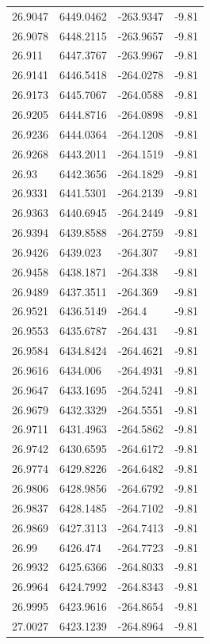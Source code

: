 \begin{table}[H]
\begin{tabular}{llll}
26.9047 & 6449.0462 & -263.9347 & -9.81 \\
26.9078 & 6448.2115 & -263.9657 & -9.81 \\
26.911 & 6447.3767 & -263.9967 & -9.81 \\
26.9141 & 6446.5418 & -264.0278 & -9.81 \\
26.9173 & 6445.7067 & -264.0588 & -9.81 \\
26.9205 & 6444.8716 & -264.0898 & -9.81 \\
26.9236 & 6444.0364 & -264.1208 & -9.81 \\
26.9268 & 6443.2011 & -264.1519 & -9.81 \\
26.93 & 6442.3656 & -264.1829 & -9.81 \\
26.9331 & 6441.5301 & -264.2139 & -9.81 \\
26.9363 & 6440.6945 & -264.2449 & -9.81 \\
26.9394 & 6439.8588 & -264.2759 & -9.81 \\
26.9426 & 6439.023 & -264.307 & -9.81 \\
26.9458 & 6438.1871 & -264.338 & -9.81 \\
26.9489 & 6437.3511 & -264.369 & -9.81 \\
26.9521 & 6436.5149 & -264.4 & -9.81 \\
26.9553 & 6435.6787 & -264.431 & -9.81 \\
26.9584 & 6434.8424 & -264.4621 & -9.81 \\
26.9616 & 6434.006 & -264.4931 & -9.81 \\
26.9647 & 6433.1695 & -264.5241 & -9.81 \\
26.9679 & 6432.3329 & -264.5551 & -9.81 \\
26.9711 & 6431.4963 & -264.5862 & -9.81 \\
26.9742 & 6430.6595 & -264.6172 & -9.81 \\
26.9774 & 6429.8226 & -264.6482 & -9.81 \\
26.9806 & 6428.9856 & -264.6792 & -9.81 \\
26.9837 & 6428.1485 & -264.7102 & -9.81 \\
26.9869 & 6427.3113 & -264.7413 & -9.81 \\
26.99 & 6426.474 & -264.7723 & -9.81 \\
26.9932 & 6425.6366 & -264.8033 & -9.81 \\
26.9964 & 6424.7992 & -264.8343 & -9.81 \\
26.9995 & 6423.9616 & -264.8654 & -9.81 \\
27.0027 & 6423.1239 & -264.8964 & -9.81 \\

\end{tabular}
\end{table}
